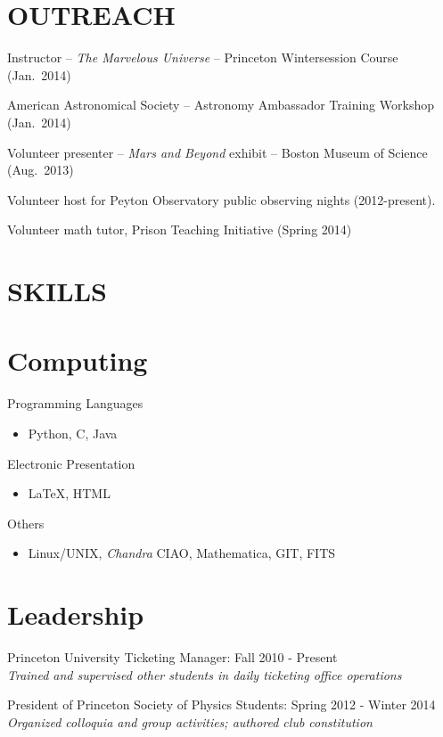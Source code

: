 \documentclass[margin]{res}
\begin{document}
\begin{resume}
\section{OUTREACH}
Instructor -- \textit{The Marvelous Universe} -- Princeton Wintersession Course (Jan.~2014)

American Astronomical Society -- Astronomy Ambassador Training Workshop (Jan.~2014)

Volunteer presenter -- \textit{Mars and
                    Beyond} exhibit -- Boston Museum of Science (Aug.~2013)

Volunteer host for Peyton Observatory public
    observing nights (2012-present).

Volunteer math tutor, Prison Teaching
    Initiative (Spring 2014)

\section{SKILLS}
\normalsize{\section{Computing}}
Programming Languages
\begin{itemize}
\item[] Python, C, Java
\end{itemize}
Electronic Presentation
\begin{itemize}
\item[] \LaTeX, HTML
\end{itemize}
Others
\begin{itemize}
\item[] Linux/UNIX, \textit{Chandra} CIAO, Mathematica, GIT, FITS
\end{itemize}

\normalsize{\section{Leadership}}
Princeton University Ticketing Manager: Fall 2010 - Present\\
\textit{Trained and supervised other students in daily ticketing office operations}

President of Princeton Society of Physics
Students: Spring 2012 - Winter 2014 \\
\textit{Organized colloquia and group activities; authored club constitution}

\end{resume} 
\end{document}
